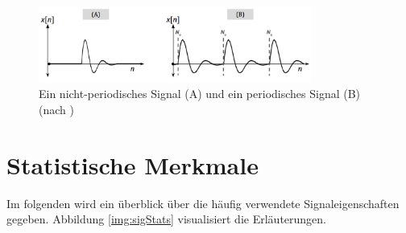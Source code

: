 \begin{figure}[h]
	\centering
	\includegraphics[width=0.8\textwidth]{bilder/periodicSig03.png}
	\caption{Ein nicht-periodisches Signal (A) und ein periodisches Signal (B) (nach \cite[S. 145]{dspGuide})}
	\label{img:periodicSic}
\end{figure}

\section{Statistische Merkmale}

Im folgenden wird ein überblick über die häufig verwendete Signaleigenschaften gegeben. Abbildung \ref{img:sigStats} visualisiert die Erläuterungen.

